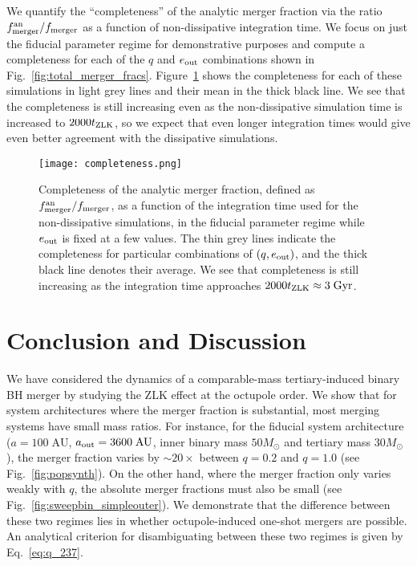 \documentclass[
        fleqn,
        usenatbib,
    ]{mnras}
\newlength{\colummwidth}
\begin{document}
We quantify the ``completeness'' of the analytic merger fraction via the ratio
$f_{\rm merger}^{\rm an} / f_{\rm merger}$ as a function of non-dissipative
integration time. We focus on just the fiducial parameter regime for
demonstrative purposes and compute a completeness for each of the $q$ and
$e_{\rm out}$ combinations shown in Fig.~\ref{fig:total_merger_fracs}.
Figure~\ref{fig:completeness} shows the completeness for each of these
simulations in light grey lines and their mean in the thick black line. We see
that the completeness is still increasing even as the non-dissipative simulation
time is increased to $2000t_{\rm ZLK}$, so we expect that even longer
integration times would give even better agreement with the dissipative
simulations.
\begin{figure}
    \centering
    \texttt{[image: completeness.png]}
    \caption{Completeness of the analytic merger fraction, defined as
    $f_{\rm merger}^{\rm an} / f_{\rm merger}$, as a function of the integration time
    used for the non-dissipative simulations, in the fiducial
    parameter regime while $e_{\rm out}$ is fixed at a few values. The thin grey
    lines indicate the completeness for particular combinations of $(q, e_{\rm
    out})$, and the thick black line denotes their average. We see that
    completeness is still increasing as the integration time approaches $2000
    t_{\rm ZLK} \approx 3\;\mathrm{Gyr}$. }\label{fig:completeness}
\end{figure}

\section{Conclusion and Discussion}\label{s:conclusion}

We have considered the dynamics of a comparable-mass tertiary-induced binary BH
merger by studying the ZLK effect at the octupole order. We show that for system
architectures where the merger fraction is substantial, most merging systems
have small mass ratios. For instance, for the fiducial system architecture ($a =
100\;\mathrm{AU}$, $a_{\rm out} = 3600\;\mathrm{AU}$, inner binary mass
$50M_{\odot}$ and tertiary mass $30M_{\odot}$), the merger fraction varies by
$\sim 20\times$ between $q = 0.2$ and $q = 1.0$ (see Fig.~\ref{fig:popsynth}).
On the other hand, where the merger fraction only varies weakly with $q$, the
absolute merger fractions must also be small (see
Fig.~\ref{fig:sweepbin_simpleouter}). We demonstrate that the difference between
these two regimes lies in whether octupole-induced one-shot mergers are
possible. An analytical criterion for disambiguating between these two regimes
is given by Eq.~\eqref{eq:q_237}.
\end{document}
